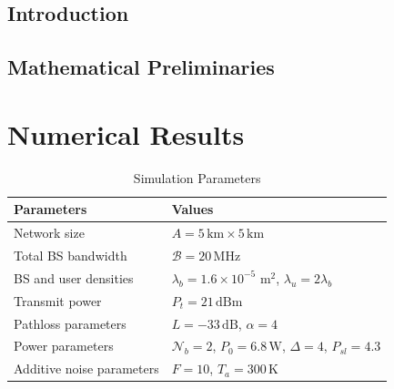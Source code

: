 \documentclass[12pt]{report}
\begin{document}
\section{Introduction}


\section{Mathematical Preliminaries}



\lipsum[2-4]









\chapter{Numerical Results}



\begin{table}[H]
\caption{Simulation Parameters} %
\centering %
    \begin{tabular}{| l | l |}
	 \hline\hline
    Parameters & Values \\ \hline
    Network size &  $A = 5\,\text{km}\times 5\,\text{km}$ \\ \hline
    Total BS bandwidth &  $\mathcal{B}=20\,\text{MHz}$ \\ \hline
		BS and user densities &  $\lambda_b = 1.6\times 10^{-5}\,\,\text{m}^2$, $\lambda_u = 2\lambda_b$  \\ \hline
    Transmit power &  $P_t = 21\, \text{dBm}$ \\ \hline
    Pathloss parameters & $L = -33\,\text{dB}$, $\alpha=4$ \\ \hline
    Power parameters & $\mathcal{N}_b = 2$, $P_0=6.8\,\text{W}$, $\Delta=4$, $P_{sl}=4.3$ \\\hline	
    Additive noise parameters & $F = 10$, $T_a = 300\,\text{K}$\\\hline		
\end{tabular}
\end{table}
\end{document}
